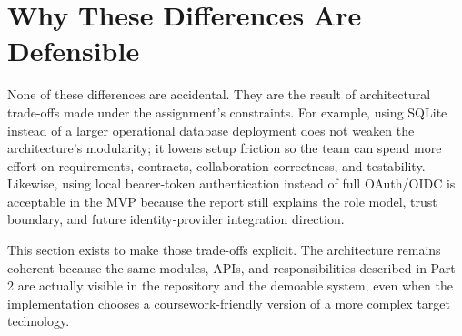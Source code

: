 \section{Why These Differences Are Defensible}

None of these differences are accidental. They are the result of architectural trade-offs made under the
assignment's constraints. For example, using SQLite instead of a larger operational database deployment
does not weaken the architecture's modularity; it lowers setup friction so the team can spend more effort
on requirements, contracts, collaboration correctness, and testability. Likewise, using local bearer-token
authentication instead of full OAuth/OIDC is acceptable in the MVP because the report still explains the
role model, trust boundary, and future identity-provider integration direction.

This section exists to make those trade-offs explicit. The architecture remains coherent because the same
modules, APIs, and responsibilities described in Part 2 are actually visible in the repository and the
demoable system, even when the implementation chooses a coursework-friendly version of a more complex
target technology.
